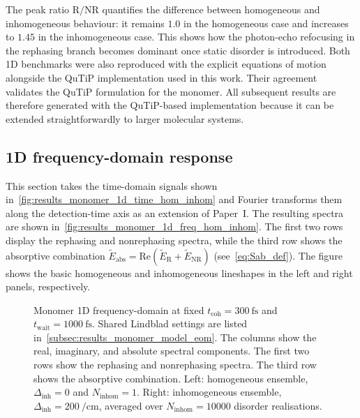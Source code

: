 The peak ratio $\mathrm{R}/\mathrm{NR}$ quantifies the difference between homogeneous and inhomogeneous behaviour: it remains $1.0$ in the homogeneous case and increases to $1.45$ in the inhomogeneous case. This shows how the photon-echo refocusing in the rephasing branch becomes dominant once static disorder is introduced. Both 1D benchmarks were also reproduced with the explicit equations of motion alongside the QuTiP implementation used in this work. Their agreement validates the QuTiP formulation for the monomer. All subsequent results are therefore generated with the QuTiP-based implementation because it can be extended straightforwardly to larger molecular systems.

\subsection{1D frequency-domain response}
\label{subsec:results_monomer_1d_freq}
This section takes the time-domain signals shown in~\autoref{fig:results_monomer_1d_time_hom_inhom} and Fourier transforms them along the detection-time axis as an extension of Paper~I. The resulting spectra are shown in~\autoref{fig:results_monomer_1d_freq_hom_inhom}. The first two rows display the rephasing and nonrephasing spectra, while the third row shows the absorptive combination $\tilde{E}_{\mathrm{abs}}=\mathrm{Re}(\tilde{E}_{\mathrm{R}}+\tilde{E}_{\mathrm{NR}})$ (see~\autoref{eq:Sab_def}). The figure shows the basic homogeneous and inhomogeneous lineshapes in the left and right panels, respectively.

\begin{figure}[htbp]
    \centering
  \caption{Monomer 1D frequency-domain at fixed $t_{\mathrm{coh}}=\SI{300}{\femto\second}$ and $t_{\mathrm{wait}}=\SI{1000}{\femto\second}$. Shared Lindblad settings are listed in~\autoref{subsec:results_monomer_model_eom}. The columns show the real, imaginary, and absolute spectral components. The first two rows show the rephasing and nonrephasing spectra. The third row shows the absorptive combination. Left: homogeneous ensemble, $\Delta_{\mathrm{inh}}=0$ and $N_{\mathrm{inhom}}=1$. Right: inhomogeneous ensemble, $\Delta_{\mathrm{inh}}=\SI{200}{\per\centi\metre}$, averaged over $N_{\mathrm{inhom}}=10000$ disorder realisations.}
    \label{fig:results_monomer_1d_freq_hom_inhom}
\end{figure}

